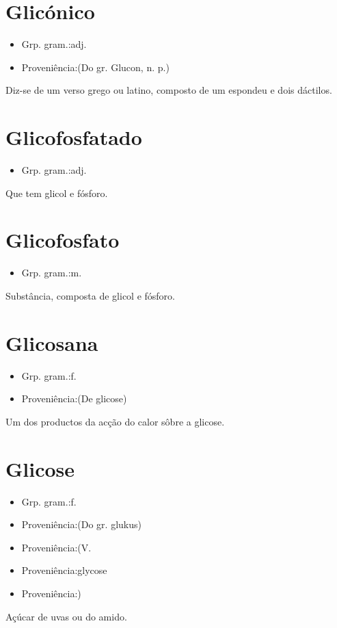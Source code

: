 \section{Glicónico}
\begin{itemize}
\item {Grp. gram.:adj.}
\end{itemize}
\begin{itemize}
\item {Proveniência:(Do gr. \textunderscore Glucon\textunderscore , n. p.)}
\end{itemize}
Diz-se de um verso grego ou latino, composto de um espondeu e dois dáctilos.
\section{Glicofosfatado}
\begin{itemize}
\item {Grp. gram.:adj.}
\end{itemize}
Que tem glicol e fósforo.
\section{Glicofosfato}
\begin{itemize}
\item {Grp. gram.:m.}
\end{itemize}
Substância, composta de glicol e fósforo.
\section{Glicosana}
\begin{itemize}
\item {Grp. gram.:f.}
\end{itemize}
\begin{itemize}
\item {Proveniência:(De \textunderscore glicose\textunderscore )}
\end{itemize}
Um dos productos da acção do calor sôbre a glicose.
\section{Glicose}
\begin{itemize}
\item {Grp. gram.:f.}
\end{itemize}
\begin{itemize}
\item {Proveniência:(Do gr. \textunderscore glukus\textunderscore )}
\end{itemize}
\begin{itemize}
\item {Proveniência:(V. }
\end{itemize}
\begin{itemize}
\item {Proveniência:glycose}
\end{itemize}
\begin{itemize}
\item {Proveniência:)}
\end{itemize}
Açúcar de uvas ou do amido.
